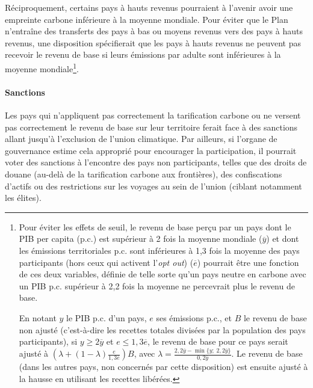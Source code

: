 \documentclass[a5paper,french,openany]{memoir}
\begin{document}
Réciproquement, certains pays à hauts revenus pourraient à l'avenir avoir une empreinte carbone inférieure à la moyenne mondiale. %
Pour éviter que le Plan n'entraîne des transferts des pays à bas ou moyens revenus vers des pays à hauts revenus, une disposition spécifierait que les pays à hauts revenus ne peuvent pas recevoir le revenu de base si leurs émissions par adulte sont inférieures à la moyenne mondiale\footnote{Pour éviter les effets de seuil, le revenu de base perçu par un pays dont le PIB per capita (p.c.) est supérieur à 2 fois la moyenne mondiale ($\overline{y}$) et dont les émissions territoriales p.c. sont inférieures à 1,3 fois la moyenne des pays participants (hors ceux qui activent l'\textit{opt out}) ($\overline{e}$) pourrait être une fonction de ces deux variables, définie de telle sorte qu'un pays neutre en carbone avec un PIB p.c. supérieur à 2,2 fois la moyenne ne percevrait plus le revenu de base. 

En notant $y$ le PIB p.c. d'un pays, $e$ ses émissions p.c., et $B$ le revenu de base non ajusté (c'est-à-dire les recettes totales divisées par la population des pays participants), si $y\geq 2\overline{y}$ et $e \leq 1,3 \overline{e}$, le revenu de base pour ce pays serait ajusté à $\left(\lambda + \left(1-\lambda \right) \frac{e}{1,3\overline{e}} \right) B$, avec $\lambda = \frac{2,2\overline{y}-\min\{y;\;2,2\overline{y}\}}{0,2\overline{y}}$. 
Le revenu de base (dans les autres pays, non concernés par cette disposition) est ensuite ajusté à la hausse en utilisant les recettes libérées.}. 

\paragraph{Sanctions}

Les pays qui n'appliquent pas correctement la tarification carbone ou ne versent pas correctement le revenu de base sur leur territoire ferait face à des sanctions allant jusqu'à l'exclusion de l'union climatique. 
Par ailleurs, si l'organe de gouvernance estime cela approprié pour encourager la participation, il pourrait voter des sanctions à l'encontre des pays non participants, telles que des droits de douane (au-delà de la tarification carbone aux frontières), des confiscations d'actifs ou des restrictions sur les voyages au sein de l'union (ciblant notamment les élites). 
\end{document}
